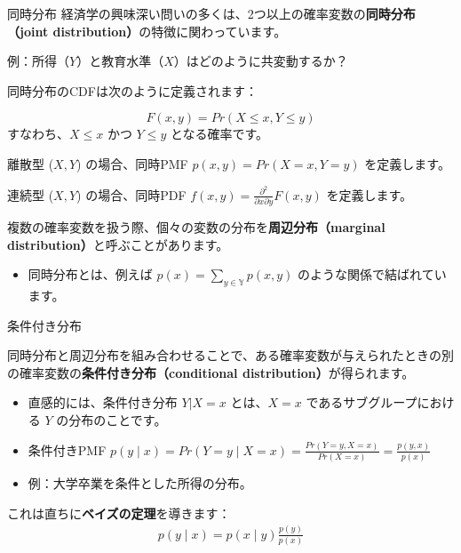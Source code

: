 \documentclass[11pt,handout]{beamer}
\newenvironment{wideitemize}{\itemize\addtolength{\itemsep}{10pt}}{\enditemize}
\begin{document}
\begin{frame}{同時分布}
\vspace{0.2cm}
経済学の興味深い問いの多くは、2つ以上の確率変数の\textbf{同時分布（joint distribution）}の特徴に関わっています。

\begin{wideitemize}
\item 例：所得（$Y$）と教育水準（$X$）はどのように共変動するか？\pause{}

\item 同時分布のCDFは次のように定義されます：
\vspace{-0.3cm}

$$F(x,y) = Pr(X \leq x, Y \leq y)$$
\noindent すなわち、$X \leq x$ かつ $Y \leq y$ となる確率です。

\pause
\item 離散型 ($X, Y$) の場合、同時PMF $p(x,y)=Pr(X=x,Y=y)$ を定義します。

\pause
\item 連続型 ($X, Y$) の場合、同時PDF $f(x,y)=\frac{\partial^2}{\partial x \partial y}F(x,y)$ を定義します。
\end{wideitemize}
\vspace{0.5cm}
\pause{}

複数の確率変数を扱う際、個々の変数の分布を\textbf{周辺分布（marginal distribution）}と呼ぶことがあります。\pause{}

\begin{itemize}
\item 同時分布とは、例えば $p(x)=\sum_{y\in\mathbb{Y}}p(x,y)$ のような関係で結ばれています。
\end{itemize}

\end{frame}

\begin{frame}{条件付き分布}

同時分布と周辺分布を組み合わせることで、ある確率変数が与えられたときの別の確率変数の\textbf{条件付き分布（conditional distribution）}が得られます。

\begin{itemize}
\item 直感的には、条件付き分布 $Y|X=x$ とは、$X=x$ であるサブグループにおける $Y$ の分布のことです。
	
\item 条件付きPMF $p(y\mid x)=Pr(Y=y\mid X=x)=\frac{Pr(Y=y,X=x)}{Pr(X=x)}=\frac{p(y,x)}{p(x)}$\pause{}
\item 例：大学卒業を条件とした所得の分布。
\end{itemize}
\vspace{0.5cm}\pause{}

これは直ちに\textbf{ベイズの定理}を導きます：
\vspace{-0.4cm}
\begin{align*}
p(y\mid x)=p(x\mid y)\frac{p(y)}{p(x)}
\end{align*}

\end{frame}
\end{document}
